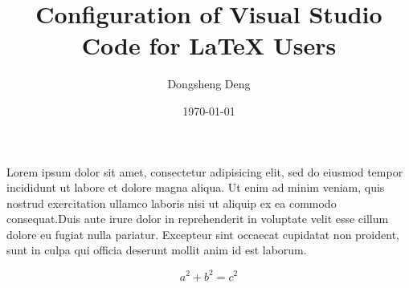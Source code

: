 \documentclass{article}
\author{Dongsheng Deng}
\title{Configuration of Visual Studio Code for LaTeX Users}
\date{\today}
\begin{document}
\maketitle

Lorem ipsum dolor sit amet, consectetur adipisicing elit, sed do eiusmod
tempor incididunt ut labore et dolore magna aliqua. Ut enim ad minim veniam,
quis nostrud exercitation ullamco laboris nisi ut aliquip ex ea commodo
consequat.Duis aute irure dolor in reprehenderit in voluptate velit esse
cillum dolore eu fugiat nulla pariatur. Excepteur sint occaecat cupidatat non
proident, \cite{GraffZivin2018} sunt in culpa qui officia deserunt mollit anim id est laborum.

\begin{equation}
    a^2+b^2=c^2
\end{equation}



\end{document}
